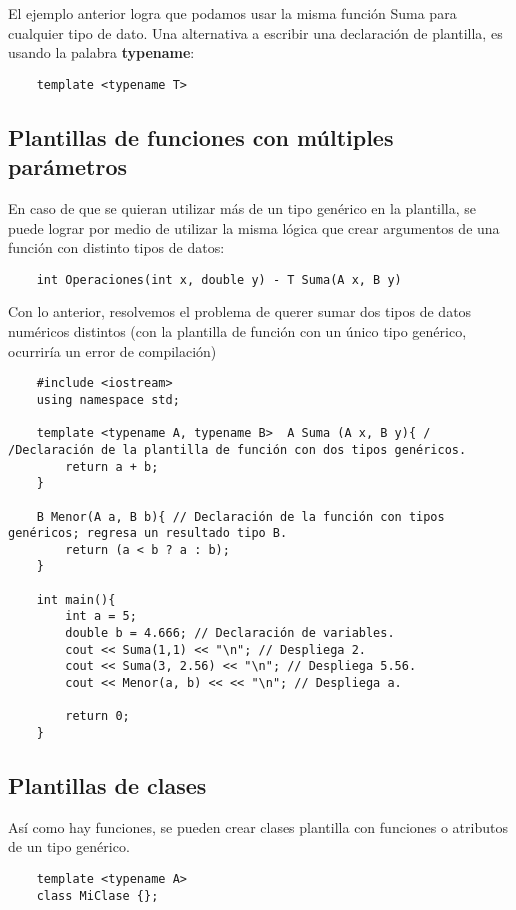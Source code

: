 El ejemplo anterior logra que podamos usar la misma función Suma para cualquier tipo de dato. Una alternativa a escribir una declaración de plantilla, es usando la palabra \textbf{typename}:
\begin{lstlisting}
    template <typename T>
\end{lstlisting}


\subsection{Plantillas de funciones con múltiples parámetros}

En caso de que se quieran utilizar más de un tipo genérico en la plantilla, se puede lograr por medio de utilizar la misma lógica que crear argumentos de una función con distinto tipos de datos:
\begin{lstlisting}
    int Operaciones(int x, double y) - T Suma(A x, B y)
\end{lstlisting}

Con lo anterior, resolvemos el problema de querer sumar dos tipos de datos numéricos distintos (con la plantilla de función con un único tipo genérico, ocurriría un error de compilación)
\begin{lstlisting}
    #include <iostream>
    using namespace std;
    
    template <typename A, typename B>  A Suma (A x, B y){ / /Declaración de la plantilla de función con dos tipos genéricos.
        return a + b;
    }
    
    B Menor(A a, B b){ // Declaración de la función con tipos genéricos; regresa un resultado tipo B.
        return (a < b ? a : b);
    }
    
    int main(){
        int a = 5;
        double b = 4.666; // Declaración de variables.
        cout << Suma(1,1) << "\n"; // Despliega 2.
        cout << Suma(3, 2.56) << "\n"; // Despliega 5.56.
        cout << Menor(a, b) << << "\n"; // Despliega a.
        
        return 0;
    }
\end{lstlisting}


\subsection{Plantillas de clases}

Así como hay funciones, se pueden crear clases plantilla con funciones o atributos de un tipo genérico.
\begin{lstlisting}
    template <typename A>
    class MiClase {};
\end{lstlisting}

